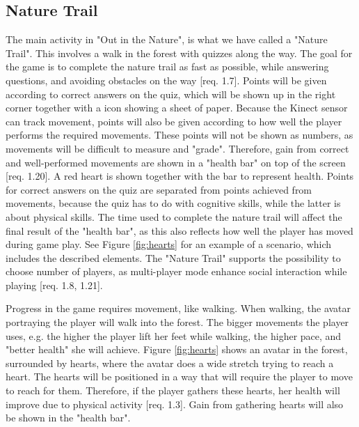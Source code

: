 \subsection{Nature Trail}
The main activity in "Out in the Nature", is what we have called a "Nature Trail". This involves a walk in the forest with quizzes along the way. The goal for the game is to complete the nature trail as fast as possible, while answering questions, and avoiding obstacles on the way [req. 1.7]. Points will be given according to correct answers on the quiz, which will be shown up in the right corner together with a icon showing a sheet of paper. Because the Kinect sensor can track movement, points will also be given according to how well the player performs the required movements. These points will not be shown as numbers, as movements will be difficult to measure and "grade". Therefore, gain from correct and well-performed movements are shown in a "health bar" on top of the screen [req. 1.20]. A red heart is shown together with the bar to represent health. Points for correct answers on the quiz are separated from points achieved from movements, because the quiz has to do with cognitive skills, while the latter is about physical skills. The time used to complete the nature trail will affect the final result of the "health bar", as this also reflects how well the player has moved during game play. See Figure \ref{fig:hearts} for an example of a scenario, which includes the described elements. The "Nature Trail" supports the possibility to choose number of players, as multi-player mode enhance social interaction while playing [req. 1.8, 1.21].  

Progress in the game requires movement, like walking. When walking, the avatar portraying the player will walk into the forest. The bigger movements the player uses, e.g. the higher the player lift her feet while walking, the higher pace, and "better health" she will achieve. Figure \ref{fig:hearts} shows an avatar in the forest, surrounded by hearts, where the avatar does a wide stretch trying to reach a heart. The hearts will be positioned in a way that will require the player to move to reach for them. Therefore, if the player gathers these hearts, her health will improve due to physical activity [req. 1.3]. Gain from gathering hearts will also be shown in the "health bar".   

